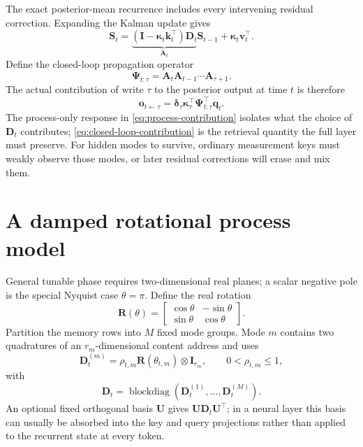 \documentclass[11pt]{article}
\newcommand{\ve}[1]{\boldsymbol{#1}}
\newcommand{\tr}{\intercal}
\newcommand{\I}{\ve{I}}
\DeclareMathOperator{\blockdiag}{blockdiag}
\begin{document}
The exact posterior-mean recurrence includes every intervening residual correction. Expanding
the Kalman update gives
\begin{equation}
  \ve{S}_t
  =\underbrace{(\I-\ve{\kappa}_t\ve{k}_t^{\tr})\ve{D}_t}_{\ve{A}_t}
   \ve{S}_{t-1}
   +\ve{\kappa}_t\ve{v}_t^{\tr}.
  \label{eq:closed-loop-carry}
\end{equation}
Define the closed-loop propagation operator
\begin{equation}
  \ve{\Psi}_{t:\tau}=\ve{A}_t\ve{A}_{t-1}\cdots\ve{A}_{\tau+1}.
  \label{eq:closed-loop-product}
\end{equation}
The actual contribution of write $\tau$ to the posterior output at time $t$ is therefore
\begin{equation}
  \ve{o}_{t\leftarrow\tau}
  =\ve{\delta}_\tau
   \ve{\kappa}_\tau^{\tr}\ve{\Psi}_{t:\tau}^{\tr}\ve{q}_t.
  \label{eq:closed-loop-contribution}
\end{equation}
The process-only response in \eqref{eq:process-contribution} isolates what the choice of
$\ve{D}_t$ contributes; \eqref{eq:closed-loop-contribution} is the retrieval quantity the
full layer must preserve. For hidden modes to survive, ordinary measurement keys must weakly
observe those modes, or later residual corrections will erase and mix them.


\section{A damped rotational process model}

General tunable phase requires two-dimensional real planes; a scalar negative pole is the
special Nyquist case $\theta=\pi$. Define the real rotation
\begin{equation}
  \ve{R}(\theta)
  =
  \begin{bmatrix}
    \cos\theta&-\sin\theta\\
    \sin\theta& \cos\theta
  \end{bmatrix}.
\end{equation}
Partition the memory rows into $M$ fixed mode groups. Mode $m$ contains two quadratures of an
$r_m$-dimensional content address and uses
\begin{equation}
  \ve{D}_t^{(m)}
  =\rho_{t,m}\ve{R}(\theta_{t,m})\otimes\I_{r_m},
  \qquad
  0<\rho_{t,m}\leq1,
  \label{eq:oscillator-block}
\end{equation}
with
\begin{equation}
  \ve{D}_t
  =\blockdiag\!\left(
    \ve{D}_t^{(1)},\ldots,\ve{D}_t^{(M)}
  \right).
  \label{eq:spectral-transition}
\end{equation}
An optional fixed orthogonal basis $\ve{U}$ gives
$\ve{U}\ve{D}_t\ve{U}^{\tr}$; in a neural layer this basis can usually be absorbed into the
key and query projections rather than applied to the recurrent state at every token.
\end{document}

